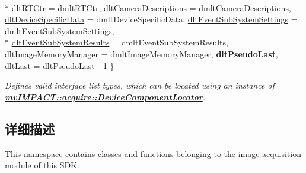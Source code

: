 \begin{DoxyCompactItemize}
\\*
\hyperlink{group___common_interface_gga0dca79bbf0803a4ecec16d6cbb1a3dbba54d331c9a054f6363890e43456d7245d}{dlt\+R\+T\+Ctr} = dmlt\+R\+T\+Ctr, 
\hyperlink{group___common_interface_gga0dca79bbf0803a4ecec16d6cbb1a3dbba7f951ed8a459077337d46a767bb58109}{dlt\+Camera\+Descriptions} = dmlt\+Camera\+Descriptions, 
\hyperlink{group___common_interface_gga0dca79bbf0803a4ecec16d6cbb1a3dbba8e80d398e934f803d879e39132375be9}{dlt\+Device\+Specific\+Data} = dmlt\+Device\+Specific\+Data, 
\hyperlink{group___common_interface_gga0dca79bbf0803a4ecec16d6cbb1a3dbbadfcd0c73c98d71804d38235e8139dad8}{dlt\+Event\+Sub\+System\+Settings} = dmlt\+Event\+Sub\+System\+Settings, 
\\*
\hyperlink{group___common_interface_gga0dca79bbf0803a4ecec16d6cbb1a3dbba854e3709b91d7b837e17de91404c5a1a}{dlt\+Event\+Sub\+System\+Results} = dmlt\+Event\+Sub\+System\+Results, 
\hyperlink{group___common_interface_gga0dca79bbf0803a4ecec16d6cbb1a3dbbaad5cff58088e33d2278563fa8f27465f}{dlt\+Image\+Memory\+Manager} = dmlt\+Image\+Memory\+Manager, 
{\bfseries dlt\+Pseudo\+Last}, 
\hyperlink{group___common_interface_gga0dca79bbf0803a4ecec16d6cbb1a3dbbadb05974e1aac0d8c3b63eeaba1fc9fe3}{dlt\+Last} = dlt\+Pseudo\+Last -\/ 1
 \}
\begin{DoxyCompactList}\small\item\em Defines valid interface list types, which can be located using an instance of {\bfseries \hyperlink{classmv_i_m_p_a_c_t_1_1acquire_1_1_device_component_locator}{mv\+I\+M\+P\+A\+C\+T\+::acquire\+::\+Device\+Component\+Locator}}. \end{DoxyCompactList}\end{DoxyCompactItemize}


\subsection{详细描述}
This namespace contains classes and functions belonging to the image acquisition module of this S\+D\+K. 